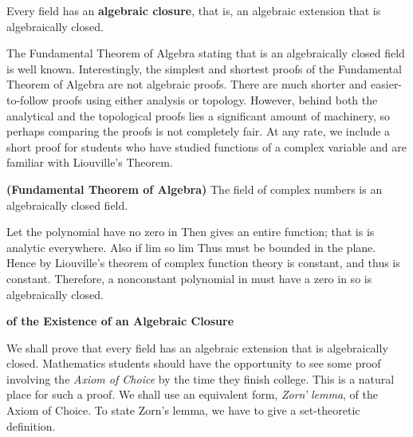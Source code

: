 \documentclass[11pt,oneside]{article}
\begin{document}
\begin{BookBody}

 Every field  has an\textbf{ algebraic closure}, that is, an algebraic extension  that is algebraically closed.

The Fundamental Theorem of Algebra stating that  is an algebraically closed field is well known. Interestingly, the simplest and shortest proofs of the Fundamental Theorem of Algebra are not algebraic proofs. There are much shorter and easier-to-follow proofs using either analysis or topology. However, behind both the analytical and the topological proofs lies a significant amount of machinery, so perhaps comparing the proofs is not completely fair. At any rate, we include a short proof for students who have studied functions of a complex variable and are familiar with Liouville’s Theorem.

 \textbf{(Fundamental Theorem of Algebra)} The field  of complex numbers is an algebraically closed field.

 Let the polynomial  have no zero in  Then  gives an entire function; that is is analytic everywhere. Also if  lim  so lim  Thus  must be bounded in the plane. Hence by Liouville’s theorem of complex function theory is constant, and thus  is constant. Therefore, a nonconstant polynomial in  must have a zero in  so  is algebraically closed. \BookEnd{\blacklozenge}

 \textbf{ of the Existence of an Algebraic Closure}

\noindent We shall prove that every field has an algebraic extension that is algebraically closed. Mathematics students should have the opportunity to see some proof involving the\textit{ Ax}\textit{iom of Choice} by the time they finish college. This is a natural place for such a proof. We shall use an equivalent form,\textit{ Zorn’} \textit{lemma}, of the Axiom of Choice. To state Zorn’s lemma, we have to give a set-theoretic definition.


\end{BookBody}
\end{document}
